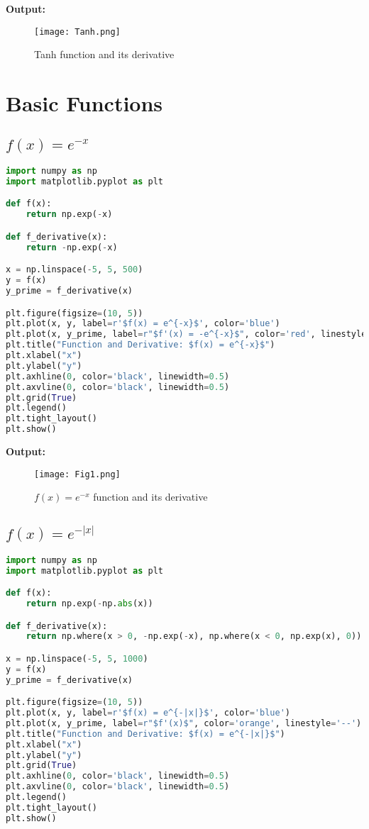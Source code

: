 \documentclass[11pt]{article}
\begin{document}
\noindent\textbf{Output:}
\begin{figure}[H]
    \centering
    \texttt{[image: Tanh.png]}
    \caption{Tanh function and its derivative}
\end{figure}

\section{Basic Functions}

\subsection{$f(x) = e^{-x}$}

\begin{lstlisting}[language=Python, caption={$f(x) = e^{-x}$ and its derivative}]
import numpy as np
import matplotlib.pyplot as plt

def f(x):
    return np.exp(-x)

def f_derivative(x):
    return -np.exp(-x)

x = np.linspace(-5, 5, 500)
y = f(x)
y_prime = f_derivative(x)

plt.figure(figsize=(10, 5))
plt.plot(x, y, label=r'$f(x) = e^{-x}$', color='blue')
plt.plot(x, y_prime, label=r"$f'(x) = -e^{-x}$", color='red', linestyle='--')
plt.title("Function and Derivative: $f(x) = e^{-x}$")
plt.xlabel("x")
plt.ylabel("y")
plt.axhline(0, color='black', linewidth=0.5)
plt.axvline(0, color='black', linewidth=0.5)
plt.grid(True)
plt.legend()
plt.tight_layout()
plt.show()
\end{lstlisting}

\noindent\textbf{Output:}
\begin{figure}[H]
    \centering
    \texttt{[image: Fig1.png]}
    \caption{$f(x) = e^{-x}$ function and its derivative}
\end{figure}

\subsection{$f(x) = e^{-|x|}$}

\begin{lstlisting}[language=Python, caption={$f(x) = e^{-|x|}$ and its derivative}]
import numpy as np
import matplotlib.pyplot as plt

def f(x):
    return np.exp(-np.abs(x))

def f_derivative(x):
    return np.where(x > 0, -np.exp(-x), np.where(x < 0, np.exp(x), 0))

x = np.linspace(-5, 5, 1000)
y = f(x)
y_prime = f_derivative(x)

plt.figure(figsize=(10, 5))
plt.plot(x, y, label=r'$f(x) = e^{-|x|}$', color='blue')
plt.plot(x, y_prime, label=r"$f'(x)$", color='orange', linestyle='--')
plt.title("Function and Derivative: $f(x) = e^{-|x|}$")
plt.xlabel("x")
plt.ylabel("y")
plt.grid(True)
plt.axhline(0, color='black', linewidth=0.5)
plt.axvline(0, color='black', linewidth=0.5)
plt.legend()
plt.tight_layout()
plt.show()
\end{lstlisting}
\end{document}
